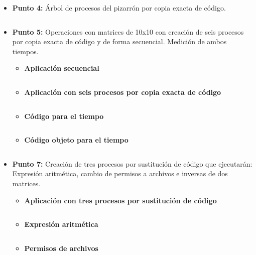 \documentclass[12pt]{article}
\begin{document}
            \begin{itemize}

         \item[\Checkmark] \textbf{Punto 4:} Árbol de procesos del pizarrón por copia exacta de código.
                    \inputminted{c++}{Code/Linux/4.c}
                
                \item[\Checkmark] \textbf{Punto 5:} Operaciones con matrices de 10x10 con creación de seis procesos por copia exacta de código y de forma secuencial. Medición de ambos tiempos.

                    \begin{itemize}
                        \item \textbf{Aplicación secuencial}
                            \inputminted{c++}{Code/Linux/operacionesMatrices.c}
                            
                        \item \textbf{Aplicación con seis procesos por copia exacta de código}
                            \inputminted{c++}{Code/Linux/5.c}  
                        
                        \item \textbf{Código para el tiempo}
                            \inputminted{c++}{Code/Linux/tiempo.h}  
                        
                        \item \textbf{Código objeto para el tiempo}
                            \inputminted{c++}{Code/Linux/tiempo.c}  
                            
                    \end{itemize}
                
                \item[\Checkmark] \textbf{Punto 7:} Creación de tres procesos por sustitución de código que ejecutarán: Expresión aritmética, cambio de permisos a archivos e inversas de dos matrices.

                    \begin{itemize}
                        \item \textbf{Aplicación con tres procesos por sustitución de código}
                            \inputminted{c++}{Code/Linux/7.c}
                        
                        \item \textbf{Expresión aritmética}
                            \inputminted{c++}{Code/Linux/expresion.c}
                        \newpage
                        \item \textbf{Permisos de archivos}
                            \inputminted{c++}{Code/Linux/permisos.c}


\end{itemize}
\end{itemize}
\end{document}
